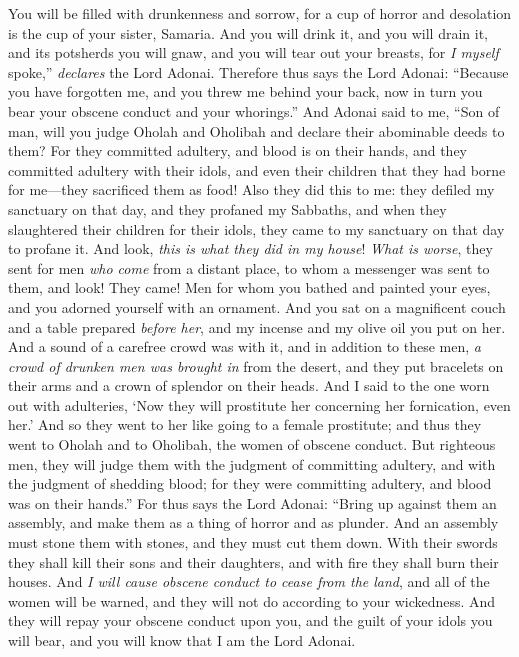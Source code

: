 \begin{biblechapter}
\verse You will be filled with drunkenness and sorrow, for a cup of horror and desolation is the cup of your sister, Samaria.
\verse And you will drink it, and you will drain it, and its potsherds you will gnaw, and you will tear out your breasts, for \textit{I myself} spoke,” \textit{declares} the Lord Adonai.
\verse Therefore thus says the Lord Adonai: “Because you have forgotten me, and you threw me behind your back, now in turn you bear your obscene conduct and your whorings.”
\verse And Adonai said to me, “Son of man, will you judge Oholah and Oholibah and declare their abominable deeds to them?
\verse For they committed adultery, and blood is on their hands, and they committed adultery with their idols, and even their children that they had borne for me—they sacrificed them as food!
\verse Also they did this to me: they defiled my sanctuary on that day, and they profaned my Sabbaths,
\verse and when they slaughtered their children for their idols, they came to my sanctuary on that day to profane it. And look, \textit{this is what they did in my house}!
\verse \textit{What is worse}, they sent for men \textit{who come} from a distant place, to whom a messenger was sent to them, and look! They came! Men for whom you bathed and painted your eyes, and you adorned yourself with an ornament.
\verse And you sat on a magnificent couch and a table prepared \textit{before her}, and my incense and my olive oil you put on her.
\verse And a sound of a carefree crowd was with it, and in addition to these men, \textit{a crowd of drunken men was brought in} from the desert, and they put bracelets on their arms and a crown of splendor on their heads.
\verse And I said to the one worn out with adulteries, ‘Now they will prostitute her concerning her fornication, even her.’
\verse And so they went to her like going to a female prostitute; and thus they went to Oholah and to Oholibah, the women of obscene conduct.
\verse But righteous men, they will judge them with the judgment of committing adultery, and with the judgment of shedding blood; for they were committing adultery, and blood was on their hands.”
\verse For thus says the Lord Adonai: “Bring up against them an assembly, and make them as a thing of horror and as plunder.
\verse And an assembly must stone them with stones, and they must cut them down. With their swords they shall kill their sons and their daughters, and with fire they shall burn their houses.
\verse And \textit{I will cause obscene conduct to cease from the land}, and all of the women will be warned, and they will not do according to your wickedness.
\verse And they will repay your obscene conduct upon you, and the guilt of your idols you will bear, and you will know that I am the Lord Adonai.
\end{biblechapter}

